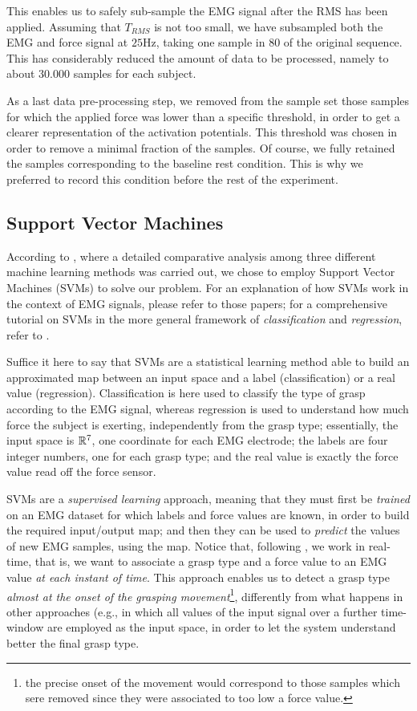 This enables us to safely sub-sample the EMG signal after the RMS has
been applied. Assuming that $T_{RMS}$ is not too small, we have
subsampled both the EMG and force signal at $25$Hz, taking one sample
in $80$ of the original sequence. This has considerably reduced the
amount of data to be processed, namely to about $30.000$ samples for
each subject.

As a last data pre-processing step, we removed from the sample set
those samples for which the applied force was lower than a specific
threshold, in order to get a clearer representation of the activation
potentials. This threshold was chosen in order to remove a minimal
fraction of the samples. Of course, we fully retained the samples
corresponding to the baseline rest condition. This is why we preferred
to record this condition before the rest of the experiment.

\subsection{Support Vector Machines}

According to \cite{2008.ICRA,2008.BioCyb}, where a detailed
comparative analysis among three different machine learning methods
was carried out, we chose to employ Support Vector Machines (SVMs) to
solve our problem. For an explanation of how SVMs work in the context
of EMG signals, please refer to those papers; for a comprehensive
tutorial on SVMs in the more general framework of
\emph{classification} and \emph{regression}, refer to
\cite{Burges98,SmolaTut2004}.

Suffice it here to say that SVMs are a statistical learning method
able to build an approximated map between an input space and a label
(classification) or a real value (regression). Classification is here
used to classify the type of grasp according to the EMG signal,
whereas regression is used to understand how much force the subject is
exerting, independently from the grasp type; essentially, the input
space is $\mathbb{R}^7$, one coordinate for each EMG electrode; the labels
are four integer numbers, one for each grasp type; and the real value
is exactly the force value read off the force sensor.

SVMs are a \emph{supervised learning} approach, meaning that they must
first be \emph{trained} on an EMG dataset for which labels and force
values are known, in order to build the required input/output map; and
then they can be used to \emph{predict} the values of new EMG samples,
using the map. Notice that, following \cite{2008.ICRA,2008.BioCyb}, we
work in real-time, that is, we want to associate a grasp type and a
force value to an EMG value \emph{at each instant of time}. This
approach enables us to detect a grasp type \emph{almost at the onset
of the grasping movement}\footnote{the precise onset of the movement
would correspond to those samples which sere removed since they were
associated to too low a force value.}, differently from what happens
in other approaches (e.g., \cite{smagt,...LUND...} in which all values
of the input signal over a further time-window are employed as the
input space, in order to let the system understand better the final
grasp type.

